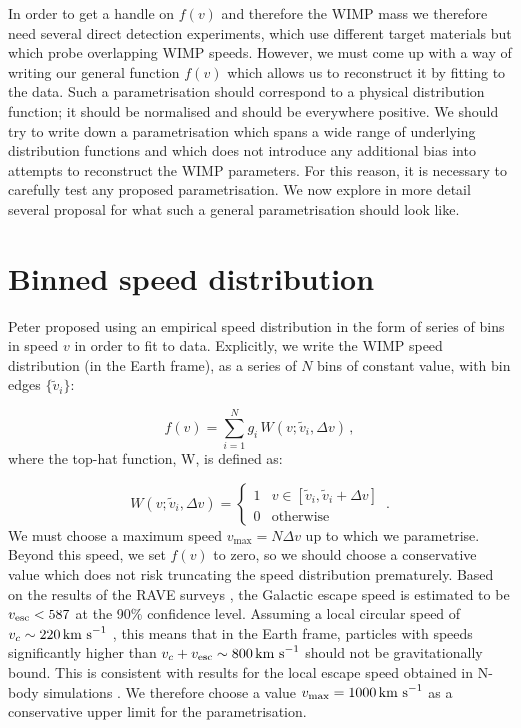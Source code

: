 In order to get a handle on $f(v)$ and therefore the WIMP mass we therefore need several direct detection experiments, which use different target materials but which probe overlapping WIMP speeds. However, we must come up with a way of writing our general function $f(v)$ which allows us to reconstruct it by fitting to the data. Such a parametrisation should correspond to a physical distribution function; it should be normalised and should be everywhere positive. We should try to write down a parametrisation which spans a wide range of underlying distribution functions and which does not introduce any additional bias into attempts to reconstruct the WIMP parameters. For this reason, it is necessary to carefully test any proposed parametrisation. We now explore in more detail several proposal for what such a general parametrisation should look like.


\section{Binned speed distribution}

Peter proposed using an empirical speed distribution in the form of series of bins in speed $v$ in order to fit to data. Explicitly, we write the WIMP speed distribution (in the Earth frame), as a series of \(N\) bins of constant value, with bin edges \(\{ \tilde{v}_i\}\): 

\begin{equation}
\label{eq:Speed:binned}
f(v) = \sum_{i = 1}^N g_i \, W(v;\tilde{v}_i,\Delta v) \,,
\end{equation}
where the top-hat function, W, is defined as:

\begin{equation}
W(v;\tilde{v}_i,\Delta v) =
\begin{cases}
   1 &  v \in [\tilde{v}_i,\tilde{v}_i+\Delta v] \\
   0  & \text{otherwise}
  \end{cases} \,.
\end{equation}
We must choose a maximum speed $v_\textrm{max} = N\Delta v$ up to which we parametrise. Beyond this speed, we set $f(v)$ to zero, so we should choose a conservative value which does not risk truncating the speed distribution prematurely. Based on the results of the RAVE surveys \cite{RAVE:2007, RAVE:2014}, the Galactic escape speed is estimated to be $\vesc < 587$ at the 90\% confidence level. Assuming a local circular speed of $v_c \sim 220 \,\textrm{km s}^{-1}$ \cite{Kerr:1986,Feast:1997}, this means that in the Earth frame, particles with speeds significantly higher than $v_c + \vesc \sim 800 \kms$ should not be gravitationally bound. This is consistent with results for the local escape speed obtained in N-body simulations \cite{Kuhlen:2010}. We therefore choose a value $v_\textrm{max} = 1000 \,\textrm{km s}^{-1}$ as a conservative upper limit for the parametrisation.

